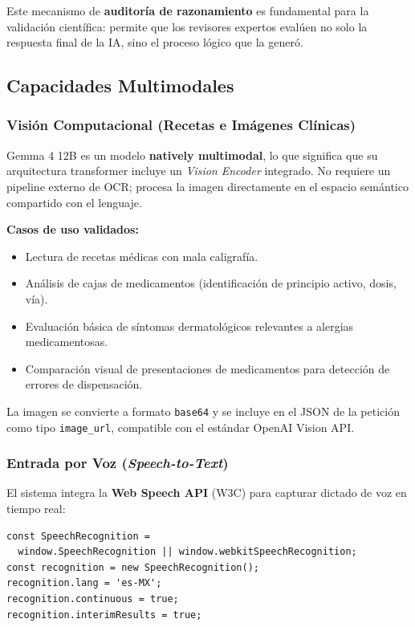 \documentclass[12pt,a4paper]{article}
\begin{document}
\noindent Este mecanismo de \textbf{auditoría de razonamiento} es fundamental para la validación
científica: permite que los revisores expertos evalúen no solo la respuesta final de la IA, sino
el proceso lógico que la generó.

\newpage

\subsection{Capacidades Multimodales}

\subsubsection{Visión Computacional (Recetas e Imágenes Clínicas)}

Gemma 4 12B es un modelo \textbf{natively multimodal}, lo que significa que su arquitectura
transformer incluye un \textit{Vision Encoder} integrado. No requiere un pipeline externo de OCR;
procesa la imagen directamente en el espacio semántico compartido con el lenguaje.

\textbf{Casos de uso validados:}
\begin{itemize}
  \item Lectura de recetas médicas con mala caligrafía.
  \item Análisis de cajas de medicamentos (identificación de principio activo, dosis, vía).
  \item Evaluación básica de síntomas dermatológicos relevantes a alergias medicamentosas.
  \item Comparación visual de presentaciones de medicamentos para detección de errores de dispensación.
\end{itemize}

La imagen se convierte a formato \texttt{base64} y se incluye en el JSON de la petición como tipo
\texttt{image\_url}, compatible con el estándar OpenAI Vision API.

\subsubsection{Entrada por Voz (\textit{Speech-to-Text})}

El sistema integra la \textbf{Web Speech API} (W3C) para capturar dictado de voz en tiempo real:

\begin{lstlisting}[style=javascript, caption=Inicialización del reconocimiento de voz]
const SpeechRecognition =
  window.SpeechRecognition || window.webkitSpeechRecognition;
const recognition = new SpeechRecognition();
recognition.lang = 'es-MX';
recognition.continuous = true;
recognition.interimResults = true;
\end{lstlisting}
\end{document}
